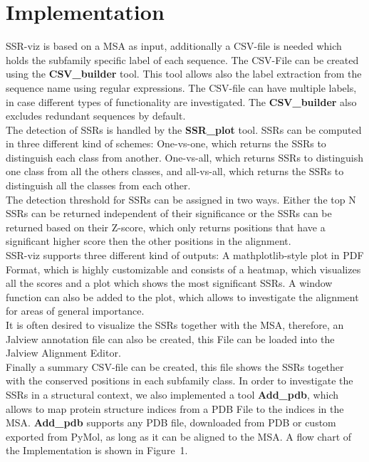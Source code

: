 \documentclass{bioinfo}
\begin{document}
\section{Implementation}
%
SSR-viz is based on a MSA as input, additionally a CSV-file is needed which holds the 
subfamily specific label of each sequence. The CSV-File can be created using the
\textbf{CSV\_builder} tool. This tool allows also the label extraction from
the sequence name using regular expressions.
The CSV-file can have multiple labels, in case different types of functionality 
are investigated. The \textbf{CSV\_builder} also excludes redundant sequences by default.\\
%
The detection of SSRs is handled by the \textbf{SSR\_plot} tool. 
SSRs can be computed in three different kind of schemes: One-vs-one,
which returns the SSRs to distinguish each class from another.
One-vs-all, which returns SSRs to distinguish one class from all the others classes,
and all-vs-all, which returns the SSRs to distinguish all the classes from each other.\\
%
The detection threshold for SSRs can be assigned in two ways. Either the top N 
SSRs can be returned independent of their significance or the SSRs can be returned based
on their Z-score, which only returns positions that have a significant higher score then 
the other positions in the alignment.\\
%
SSR-viz supports three different kind of outputs:
A mathplotlib-style plot in PDF Format, which is highly customizable and consists
of a heatmap, which visualizes all the scores and a plot which shows the most 
significant SSRs. A window function can also be added to the plot, which allows 
to investigate the alignment for areas of general importance. \\
%
It is often desired to visualize the SSRs together with the MSA, therefore,
an Jalview annotation file can also be created, this File can be loaded into 
the Jalview Alignment Editor.\\
%
Finally a summary CSV-file can be created, this file shows the SSRs
together with the conserved positions in each subfamily class. 
In order to investigate the SSRs in a structural context,
we also implemented a tool \textbf{Add\_pdb}, which allows to 
map protein structure indices from a PDB File to the indices in the MSA.
\textbf{Add\_pdb} supports any PDB file, downloaded from PDB or custom exported from 
PyMol, as long as it can be aligned to the MSA.
A flow chart of the Implementation is shown in Figure~1\vphantom{\ref{fig:01}}.
\end{document}
